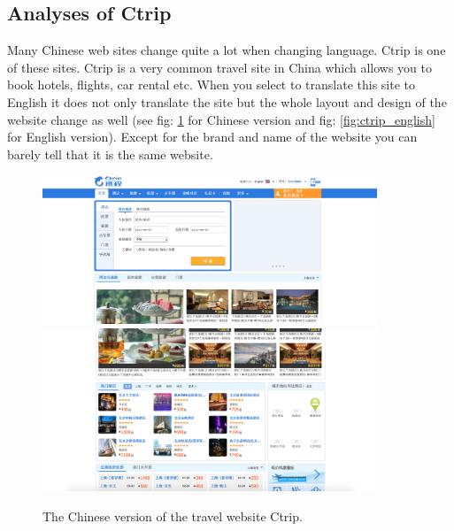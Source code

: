 \subsection{Analyses of Ctrip}
Many Chinese web sites change quite a lot when changing language. Ctrip is one of these sites. Ctrip is a very common travel site in China which allows you to book hotels, flights, car rental etc. When you select to translate this site to English it does not only translate the site but the whole layout and design of the website change as well (see  fig: \ref{fig:ctrip_chinese} for Chinese version and fig: \ref{fig:ctrip_english} for English version). Except for the brand and name of the website you can barely tell that it is the same website.
\begin{figure}[h]
\centering
\includegraphics[width=100mm]{Images/ctrip_chinese1}
\includegraphics[width=100mm]{Images/ctrip_chinese2}
\decoRule
\caption[Chinese version of Ctrip]{The Chinese version of the travel website Ctrip.}
\label{fig:ctrip_chinese}
\end{figure}

